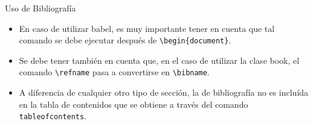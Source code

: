 \documentclass[12pt]{beamer}
\begin{document}
\begin{frame}{Uso de Bibliograf\'ia}
  \begin{itemize}
    \item <1->En caso de utilizar babel, es muy
    importante tener en cuenta que tal comando se debe ejecutar después de \texttt{\color{blue}\textbackslash begin\{document\}}.
    \item<2-> Se debe tener también en cuenta que, en el caso de utilizar la clase book, el comando \texttt{\color{blue}\textbackslash refname} pasa a convertirse en \texttt{\color{blue}\textbackslash bibname}.
    \item<3-> A diferencia de cualquier otro tipo de sección, la de bibliografía no es incluída en la tabla de contenidos que se obtiene a través del comando \texttt{\color{blue}tableofcontents}.
  \end{itemize}
\end{frame}
\end{document}

